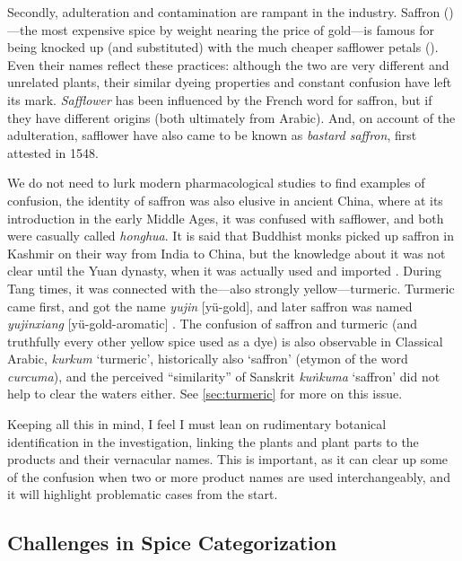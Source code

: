 Secondly, adulteration and contamination are rampant in the industry. Saffron ()---the most expensive spice by weight nearing the price of gold---is famous for being knocked up (and substituted) with the much cheaper safflower petals (). Even their names reflect these practices: although the two are very different and unrelated plants, their similar dyeing properties and constant confusion have left its mark. \textit{Safflower} has been influenced by the French word for saffron, but if they have different origins (both ultimately from Arabic). And, on account of the adulteration, safflower have also came to be known as \textit{bastard saffron}, first attested in 1548. 

We do not need to lurk modern pharmacological studies to find examples of confusion, the identity of saffron was also elusive in ancient China, where at its introduction in the early Middle Ages, it was confused with safflower, and both were casually called  \textit{honghua}. It is said that Buddhist monks picked up saffron in Kashmir on their way from India to China, but the knowledge about it was not clear until the Yuan dynasty, when it was actually used and imported \autocite{laufer_sino-iranica_1919}. During Tang times, it was connected with the---also strongly yellow---turmeric. Turmeric came first, and got the name  \textit{yujin} [yü-gold], and later saffron was named  \textit{yujinxiang} [yü-gold-aromatic] \autocite{schafer_golden_1985}. The confusion of saffron and turmeric (and truthfully every other yellow spice used as a dye) is also observable in Classical Arabic, \textit{kurkum} `turmeric', historically also `saffron' (etymon of the word \textit{curcuma}), and the perceived ``similarity'' of Sanskrit  \textit{kuṅkuma} `saffron' did not help to clear the waters either. See \cref{sec:turmeric} for more on this issue.

Keeping all this in mind, I feel I must lean on rudimentary botanical identification in the investigation, linking the plants and plant parts to the products and their vernacular names. This is important, as it can clear up some of the confusion when two or more product names are used interchangeably, and it will highlight problematic cases from the start.

\subsection{Challenges in Spice Categorization}


